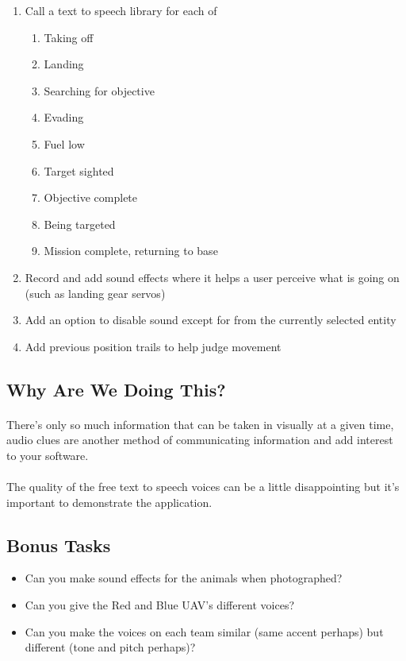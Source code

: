 \documentclass[11pt]{book}
\begin{document}
\begin{enumerate}
\item Call a text to speech library for each of
    \begin{enumerate}
    \item Taking off
    \item Landing
    \item Searching for objective
    \item Evading
    \item Fuel low
    \item Target sighted
    \item Objective complete
    \item Being targeted
    \item Mission complete, returning to base
    \end{enumerate}
\item Record and add sound effects where it helps a user perceive what is going on (such as landing gear servos)
\item Add an option to disable sound except for from the currently selected entity
\item Add previous position trails to help judge movement
\end{enumerate}

\subsection{Why Are We Doing This?}

\paragraph{} There's only so much information that can be taken in visually at a given time, audio clues are another method of communicating information and add interest to your software.

\paragraph{} The quality of the free text to speech voices can be a little disappointing but it's important to demonstrate the application.

\subsection{Bonus Tasks}

\begin{itemize}
\item Can you make sound effects for the animals when photographed?
\item Can you give the Red and Blue UAV's different voices?
\item Can you make the voices on each team similar (same accent perhaps) but different (tone and pitch perhaps)?
\end{itemize}
\end{document}
